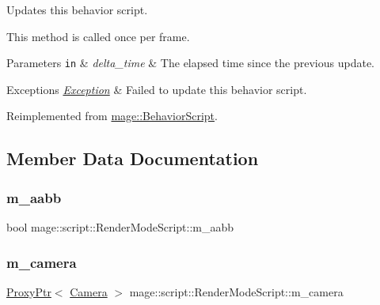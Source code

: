 Updates this behavior script.

This method is called once per frame.


\begin{DoxyParams}[1]{Parameters}
\mbox{\tt in}  & {\em delta\+\_\+time} & The elapsed time since the previous update. \\
\hline
\end{DoxyParams}

\begin{DoxyExceptions}{Exceptions}
{\em \hyperlink{classmage_1_1_exception}{Exception}} & Failed to update this behavior script. \\
\hline
\end{DoxyExceptions}


Reimplemented from \hyperlink{classmage_1_1_behavior_script_afb9cf3759edf8876416d1df85489cba6}{mage\+::\+Behavior\+Script}.



\subsection{Member Data Documentation}
\hypertarget{classmage_1_1script_1_1_render_mode_script_a6b8036624a534f1107ff38744d38f606}{}\label{classmage_1_1script_1_1_render_mode_script_a6b8036624a534f1107ff38744d38f606} 
\subsubsection{\texorpdfstring{m\+\_\+aabb}{m\_aabb}}
{\footnotesize\ttfamily bool mage\+::script\+::\+Render\+Mode\+Script\+::m\+\_\+aabb\hspace{0.3cm}{\ttfamily [private]}}

\hypertarget{classmage_1_1script_1_1_render_mode_script_af29352d3f14f7456941c3f2d51fe469d}{}\label{classmage_1_1script_1_1_render_mode_script_af29352d3f14f7456941c3f2d51fe469d} 
\subsubsection{\texorpdfstring{m\+\_\+camera}{m\_camera}}
{\footnotesize\ttfamily \hyperlink{classmage_1_1_proxy_ptr}{Proxy\+Ptr}$<$ \hyperlink{classmage_1_1_camera}{Camera} $>$ mage\+::script\+::\+Render\+Mode\+Script\+::m\+\_\+camera\hspace{0.3cm}{\ttfamily [private]}}

